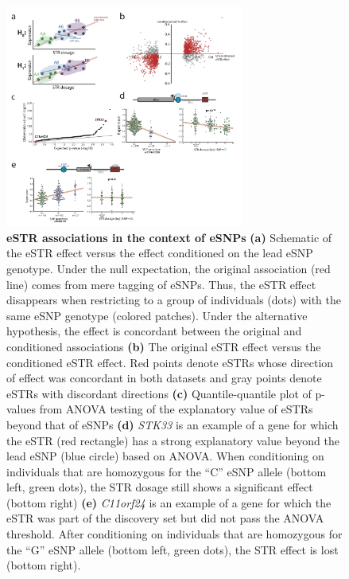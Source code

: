 \begin{figure}[h!]
\centering
\label{fig:estrfig3}
\includegraphics[width=0.7\textwidth]{Figures/Chapter4/Fig3}
\caption{\textbf{eSTR associations in the context of eSNPs} \textbf{(a)} Schematic of the eSTR effect versus the effect conditioned on the lead eSNP genotype. Under the null expectation, the original association (red line) comes from mere tagging of eSNPs. Thus, the eSTR effect disappears when restricting to a group of individuals (dots) with the same eSNP genotype (colored patches). Under the alternative hypothesis, the effect is concordant between the original and conditioned associations \textbf{(b)} The original eSTR effect versus the conditioned eSTR effect. Red points denote eSTRs whose direction of effect was concordant in both datasets and gray points denote eSTRs with discordant directions \textbf{(c)} Quantile-quantile plot of p-values from ANOVA testing of the explanatory value of eSTRs beyond that of eSNPs \textbf{(d)} \emph{STK33} is an example of a gene for which the eSTR (red rectangle) has a strong explanatory value beyond the lead eSNP (blue circle) based on ANOVA. When conditioning on individuals that are homozygous for the ``C'' eSNP allele (bottom left, green dots), the STR dosage still shows a significant effect (bottom right) \textbf{(e)} \emph{C11orf24} is an example of a gene for which the eSTR was part of the discovery set but did not pass the ANOVA threshold. After conditioning on individuals that are homozygous for the ``G'' eSNP allele (bottom left, green dots), the STR effect is lost (bottom right).}
\end{figure}

